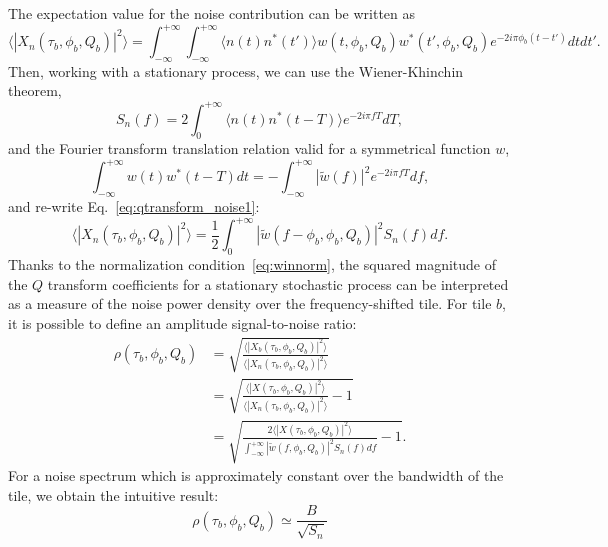 The expectation value for the noise contribution can be written as
\begin{equation}
  \langle |X_n(\tau_b, \phi_b, Q_b)|^2 \rangle =  \int_{-\infty}^{+\infty}{ \int_{-\infty}^{+\infty}{ \langle n(t)n^*(t') \rangle w(t,\phi_b,Q_b) w^*(t',\phi_b,Q_b) e^{-2i\pi\phi_b(t-t')}dt}dt'}.
  \label{eq:qtransform_noise1}
\end{equation}
Then, working with a stationary process, we can use the Wiener-Khinchin theorem,
\begin{equation}
  S_n(f)=2\int_{0}^{+\infty}{ \langle n(t)n^*(t-T) \rangle e^{-2i\pi fT}dT},
\end{equation}
and the Fourier transform translation relation valid for a symmetrical function $w$,
\begin{equation}
  \int_{-\infty}^{+\infty}{w(t)w^*(t-T)dt} = -\int_{-\infty}^{+\infty}{|\tilde{w}(f)|^2e^{-2i\pi fT}df},
\end{equation}
and re-write Eq.~\ref{eq:qtransform_noise1}:
\begin{equation}
  \langle |X_n(\tau_b, \phi_b, Q_b)|^2 \rangle =  \frac{1}{2}\int_{0}^{+\infty}{ |\tilde{w}(f-\phi_b,\phi_b,Q_b)|^2S_n(f) df }.
  \label{eq:qtransform_noise}
\end{equation}
Thanks to the normalization condition~\ref{eq:winnorm}, the squared magnitude of the $Q$ transform coefficients for a stationary stochastic process can be interpreted as a measure of the noise power density over the frequency-shifted tile.
For tile $b$, it is possible to define an amplitude signal-to-noise ratio:
\begin{align}
  \rho(\tau_b, \phi_b, Q_b) &=  \sqrt{\frac{\langle|X_b(\tau_b, \phi_b, Q_b)|^2\rangle}{\langle |X_n(\tau_b, \phi_b, Q_b)|^2\rangle}} \label{eq:snr1} \\
  &=  \sqrt{\frac{\langle|X(\tau_b, \phi_b, Q_b)|^2\rangle}{\langle |X_n(\tau_b, \phi_b, Q_b)|^2\rangle}-1} \label{eq:snr2} \\
  &= \sqrt{\frac{2\langle |X(\tau_b, \phi_b, Q_b)|^2 \rangle}{\int_{-\infty}^{+\infty}{ |\tilde{w}(f,\phi_b,Q_b)|^2S_n(f) df}} -1 }\label{eq:snr3}.
\end{align}
For a noise spectrum which is approximately constant over the bandwidth of the tile, we obtain the intuitive result:
\begin{equation}
  \rho(\tau_b, \phi_b, Q_b) \simeq \frac{B}{\sqrt{S_n}}
\end{equation}


